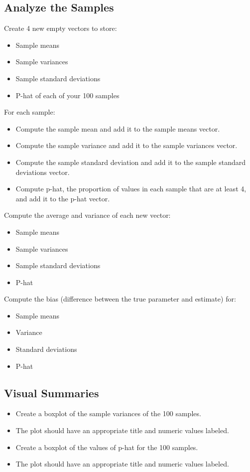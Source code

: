 \documentclass{article}
\begin{document}
\subsection{Analyze the Samples}
Create 4 new empty vectors to store:
\begin{itemize}
    \item Sample means
    \item Sample variances
    \item Sample standard deviations
    \item P-hat of each of your 100 samples
\end{itemize}

\item For each sample:
\begin{itemize}
    \item Compute the sample mean and add it to the sample means vector.
    \item Compute the sample variance and add it to the sample variances vector.
    \item Compute the sample standard deviation and add it to the sample standard deviations vector.
    \item Compute p-hat, the proportion of values in each sample that are at least 4, and add it to the p-hat vector.
\end{itemize}

\item Compute the average and variance of each new vector:
\begin{itemize}
    \item Sample means
    \item Sample variances
    \item Sample standard deviations
    \item P-hat
\end{itemize}

\item Compute the bias (difference between the true parameter and estimate) for:
\begin{itemize}
    \item Sample means
    \item Variance
    \item Standard deviations
    \item P-hat
\end{itemize}

\subsection{Visual Summaries}
\begin{itemize}
    \item Create a boxplot of the sample variances of the 100 samples.
    \item The plot should have an appropriate title and numeric values labeled.
    \item Create a boxplot of the values of p-hat for the 100 samples.
    \item The plot should have an appropriate title and numeric values labeled.
\end{itemize}
\end{document}
